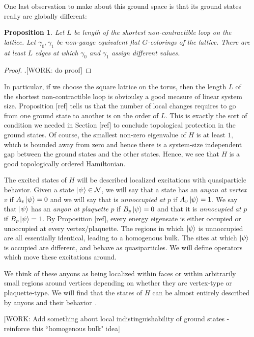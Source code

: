 \documentclass{article}
\newtheorem{proposition}{Proposition}[section]
\theoremstyle{definition}
\numberwithin{figure}{section}
\begin{document}
One last observation to make about this ground space is that its ground states really are globally different:

\begin{proposition} Let $L$ be length of the shortest non-contractible loop on the lattice. Let $\gamma_0,\gamma_1$ be non-gauge equivalent flat $G$-colorings of the lattice. There are at least $L$ edges at which $\gamma_0$ and $\gamma_1$ assign different values.
\end{proposition} 
\begin{proof}.[WORK: do proof]
\end{proof}

In particular, if we choose the square lattice on the torus, then the length $L$ of the shortest non-contractible loop is obvioulsy a good measure of linear system size. Proposition [ref] tells us that the number of local changes requires to go from one ground state to another is on the order of $L$. This is exactly the sort of condition we needed in Section [ref] to conclude topological protection in the ground states. Of course, the smallest non-zero eigenvalue of $H$ is at least $1$, which is bounded away from zero and hence there is a system-size independent gap between the ground states and the other states. Hence, we see that $H$ is a good topologically ordered Hamiltonian. 

The excited states of $H$ will be described localized excitations with quasiparticle behavior. Given a state $\ket{\psi}\in \mathcal{N}$, we will say that a state has an \textit{anyon at vertex $v$} if $A_v\ket{\psi}=0$ and we will say that is \textit{unnoccupied at $p$} if $A_v\ket{\psi}=1$. We say that $\ket{\psi}$ has an \textit{anyon at plaquette $p$} if $B_p\ket{\psi}=0$ and that it is \textit{unnocupied at $p$} if $B_p\ket{\psi}=1$. By Proposition [ref], every energy eigensate is either occupied or unoccupied at every vertex/plaquette. The regions in which $\ket{\psi}$ is unnoccupied are all essentially identical, leading to a homogenous bulk. The sites at which $\ket{\psi}$ is occupied are different, and behave as quasiparticles. We will define operators which move these excitations around.

We think of these anyons as being localized within faces or within arbitrarily small regions around vertices depending on whether they are vertex-type or plaquette-type. We will find that the states of $H$ can be almost entirely described by anyons and their behavior .

[WORK: Add something about local indistinguishability of ground states - reinforce this ``homogenous bulk" idea]
\end{document}
